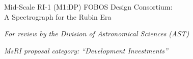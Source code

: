 \documentclass[oneside,11pt]{amsart}
\begin{document}


\vspace*{-1.5cm}


\centerline{\textsf {\Large Mid-Scale RI-1 (M1:DP) FOBOS Design Consortium: \\ A Spectrograph for the Rubin Era}}
\centerline{\emph{{\small For review by the Division of Astronomical Sciences (AST)}}}
\centerline{{\it MsRI proposal category: ``Development Investments''}}




\end{document}
